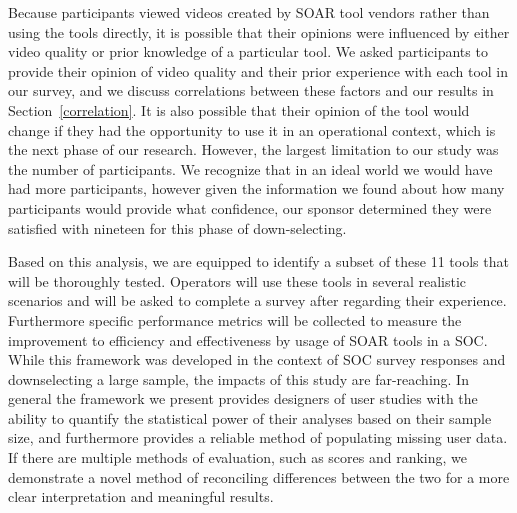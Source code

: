 Because participants viewed videos created by SOAR tool vendors rather than using the tools directly, it is possible that their opinions were influenced by either video quality or prior knowledge of a particular tool.
We asked participants to provide their opinion of video quality and their prior experience with each tool in our survey, and we discuss correlations between these factors and our results in Section~\ref{correlation}. 
It is also possible that their opinion of the tool would change if they had the opportunity to use it in an operational context, which is the next phase of our research. However, the largest limitation to our study was the number of participants. We recognize that in an ideal world we would have had more participants, however given the information we found about how many participants would provide what confidence, our sponsor determined they were satisfied with nineteen for this phase of down-selecting. 

Based on this analysis, we are equipped to identify a subset of these 11 tools that will be thoroughly tested. Operators will use these tools in several realistic scenarios and will be asked to complete a survey after regarding their experience. Furthermore specific performance metrics will be collected to measure the improvement to efficiency and effectiveness by usage of SOAR tools in a SOC. While this framework was developed in the context of SOC survey responses and downselecting a large sample, the impacts of this study are far-reaching. In general the framework we present provides designers of user studies with the ability to quantify the statistical power of their analyses based on their sample size, and furthermore provides a reliable method of populating missing user data. If there are multiple methods of evaluation, such as scores and ranking, we demonstrate a novel method of reconciling differences between the two for a more clear interpretation and meaningful results.
